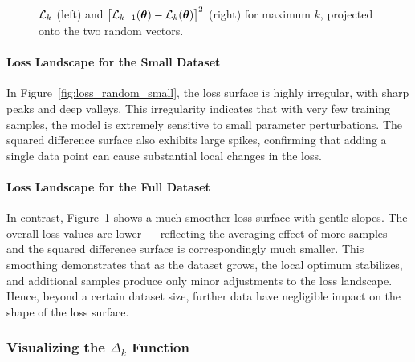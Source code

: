 \documentclass{article}
\begin{document}
\begin{figure}[!htbp]
  \hspace*{-2.2cm}
  \caption{$\mathcal{L}_k$ (left) and $\bigl[ \mathcal{L}_{k+1}(\boldsymbol{\theta}) - \mathcal{L}_k(\boldsymbol{\theta}) \bigr]^2$ (right) for maximum $k$, projected onto the two random vectors.}
  \label{fig:loss_random_big}
\end{figure}

\paragraph{Loss Landscape for the Small Dataset}
In Figure~\ref{fig:loss_random_small}, the loss surface is highly irregular, with sharp peaks and deep valleys.
This irregularity indicates that with very few training samples, the model is extremely sensitive to small parameter perturbations.
The squared difference surface also exhibits large spikes, confirming that adding a single data point can cause substantial local changes
in the loss.

\paragraph{Loss Landscape for the Full Dataset}
In contrast, Figure~\ref{fig:loss_random_big} shows a much smoother loss surface with gentle slopes. The overall loss
values are lower --- reflecting the averaging effect of more samples --- and the squared difference surface is correspondingly much smaller.
This smoothing demonstrates that as the dataset grows, the local optimum stabilizes, and additional samples produce only minor
adjustments to the loss landscape. Hence, beyond a certain dataset size, further data have negligible impact on the shape of the loss
surface.

\subsubsection{Visualizing the \texorpdfstring{$\Delta_k$}{Delta k} Function}
\end{document}
